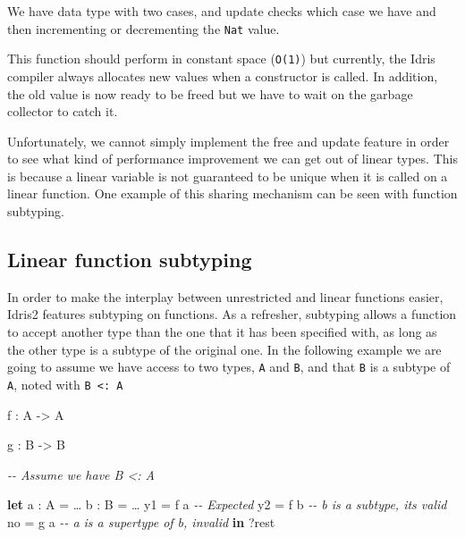 \documentclass[
]{article}
\newenvironment{Shaded}{}{}
\newcommand{\CommentTok}[1]{\textcolor[rgb]{0.38,0.63,0.69}{\textit{#1}}}
\newcommand{\DataTypeTok}[1]{\textcolor[rgb]{0.56,0.13,0.00}{#1}}
\newcommand{\KeywordTok}[1]{\textcolor[rgb]{0.00,0.44,0.13}{\textbf{#1}}}
\newcommand{\NormalTok}[1]{#1}
\newcommand{\OperatorTok}[1]{\textcolor[rgb]{0.40,0.40,0.40}{#1}}
\newcommand{\OtherTok}[1]{\textcolor[rgb]{0.00,0.44,0.13}{#1}}
\begin{document}
We have data type with two cases, and update checks which case we have
and then incrementing or decrementing the \texttt{Nat} value.

This function should perform in constant space (\texttt{O(1)}) but
currently, the Idris compiler always allocates new values when a
constructor is called. In addition, the old value is now ready to be
freed but we have to wait on the garbage collector to catch it.

Unfortunately, we cannot simply implement the free and update feature in
order to see what kind of performance improvement we can get out of
linear types. This is because a linear variable is not guaranteed to be
unique when it is called on a linear function. One example of this
sharing mechanism can be seen with function subtyping.

\hypertarget{linear-function-subtyping}{%
\subsection{Linear function subtyping}\label{linear-function-subtyping}}

In order to make the interplay between unrestricted and linear functions
easier, Idris2 features subtyping on functions. As a refresher,
subtyping allows a function to accept another type than the one that it
has been specified with, as long as the other type is a subtype of the
original one. In the following example we are going to assume we have
access to two types, \texttt{A} and \texttt{B}, and that \texttt{B} is a
subtype of \texttt{A}, noted with \texttt{B\ \textless{}:\ A}

\begin{Shaded}
\begin{Highlighting}[]

\NormalTok{f }\OperatorTok{:} \DataTypeTok{A} \OtherTok{{-}\textgreater{}} \DataTypeTok{A}

\NormalTok{g }\OperatorTok{:} \DataTypeTok{B} \OtherTok{{-}\textgreater{}} \DataTypeTok{B}

\CommentTok{{-}{-} Assume we have B \textless{}: A}

\KeywordTok{let}\NormalTok{ a }\OperatorTok{:} \DataTypeTok{A} \OtherTok{=}\NormalTok{ …}
\NormalTok{    b }\OperatorTok{:} \DataTypeTok{B} \OtherTok{=}\NormalTok{ … }
\NormalTok{    y1 }\OtherTok{=}\NormalTok{ f a }\CommentTok{{-}{-} Expected}
\NormalTok{    y2 }\OtherTok{=}\NormalTok{ f b }\CommentTok{{-}{-} b is a subtype, it\textquotesingle{}s valid}
\NormalTok{    no }\OtherTok{=}\NormalTok{ g a }\CommentTok{{-}{-} a is a supertype of b, invalid}
 \KeywordTok{in} \OperatorTok{?}\NormalTok{rest}
\end{Highlighting}
\end{Shaded}
\end{document}
